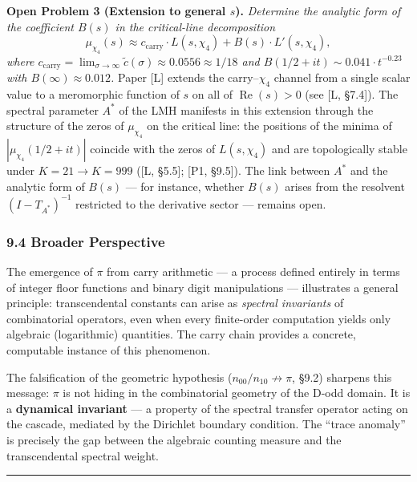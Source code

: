 \documentclass[
  11pt,
]{article}
\begin{document}
\textbf{Open Problem 3 (Extension to general \(s\)).} \emph{Determine the
analytic form of the coefficient \(B(s)\) in the critical-line decomposition}
\[\mu_{\chi_4}(s) \approx c_{\mathrm{carry}} \cdot L(s, \chi_4) + B(s) \cdot L'(s, \chi_4),\]
\emph{where
\(c_{\mathrm{carry}} = \lim_{\sigma \to \infty} \tilde{c}(\sigma) \approx 0.0556 \approx 1/18\)
and \(B(1/2+it) \sim 0.041 \cdot t^{-0.23}\) with \(B(\infty) \approx 0.012\).}
Paper {[}L{]} extends the carry--\(\chi_4\) channel from a single scalar value
to a meromorphic function of \(s\) on all of \(\operatorname{Re}(s) > 0\) (see
{[}L, §7.4{]}). The spectral parameter \(A^{\ast}\) of the LMH manifests in this
extension through the structure of the zeros of \(\mu_{\chi_4}\) on the critical
line: the positions of the minima of \(|\mu_{\chi_4}(1/2 + it)|\) coincide with
the zeros of \(L(s, \chi_4)\) and are topologically stable under
\(K = 21 \to K = 999\) ({[}L, §5.5{]}; {[}P1, §9.5{]}). The link between
\(A^{\ast}\) and the analytic form of \(B(s)\) --- for instance, whether
\(B(s)\) arises from the resolvent \((I - T_{A^{\ast}})^{-1}\) restricted to the
derivative sector --- remains open.

\subsubsection{9.4 Broader Perspective}\label{broader-perspective}

The emergence of \(\pi\) from carry arithmetic --- a process defined entirely in
terms of integer floor functions and binary digit manipulations --- illustrates
a general principle: transcendental constants can arise as \emph{spectral
invariants} of combinatorial operators, even when every finite-order computation
yields only algebraic (logarithmic) quantities. The carry chain provides a
concrete, computable instance of this phenomenon.

The falsification of the geometric hypothesis (\(n_{00}/n_{10} \not\to \pi\),
§9.2) sharpens this message: \(\pi\) is not hiding in the combinatorial geometry
of the D-odd domain. It is a \textbf{dynamical invariant} --- a property of the
spectral transfer operator acting on the cascade, mediated by the Dirichlet
boundary condition. The ``trace anomaly'' is precisely the gap between the
algebraic counting measure and the transcendental spectral weight.

\begin{center}\rule{0.5\linewidth}{0.5pt}\end{center}
\end{document}
